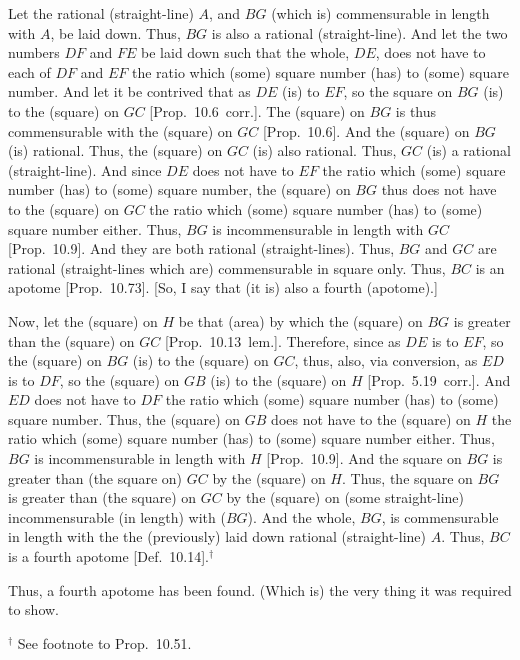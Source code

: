 \begin{Parallel}{}{}
{Let the rational (straight-line) $A$, and $BG$ (which is)
commensurable in length with $A$, be laid down.
Thus, $BG$ is also a rational (straight-line). And let the two numbers $DF$
and $FE$ be laid down such that the whole, $DE$, does not have to
each of $DF$ and $EF$ the ratio which (some) square number (has)
to (some) square number. And let it be contrived that as $DE$
(is) to $EF$, so the square on $BG$ (is) to the (square) on $GC$
[Prop.~10.6~corr.]. The (square) on $BG$ is
thus commensurable with the (square) on $GC$ [Prop.~10.6]. And the (square) on $BG$ (is)
rational. Thus, the (square) on $GC$ (is) also rational. Thus, $GC$
(is) a rational (straight-line). And since $DE$ does not have to $EF$
the ratio which (some) square number (has) to (some) square number,
the (square) on $BG$ thus does not have to the (square) on $GC$ the
ratio which (some) square number (has) to (some) square number either.
Thus, $BG$ is incommensurable in length with $GC$ [Prop.~10.9]. And they are both rational (straight-lines). Thus, $BG$ and $GC$ are rational (straight-lines which are)
commensurable in square only. Thus, $BC$ is an apotome [Prop.~10.73]. [So, I say that
(it is) also a fourth (apotome).]

Now, let the (square) on $H$ be that (area) by which the (square)
on $BG$ is greater than the (square) on $GC$ [Prop.~10.13~lem.]. Therefore, since as
$DE$ is to $EF$, so the (square) on $BG$ (is) to the (square)
on $GC$, thus, also, via conversion, as $ED$ is to $DF$, so the
(square) on $GB$ (is) to the (square) on $H$ [Prop.~5.19~corr.]. And $ED$ does not have to
$DF$ the ratio which (some) square number (has) to (some) square number.
Thus, the (square) on $GB$ does not have to the (square) on $H$
the ratio which (some) square number (has) to (some) square number either.
Thus, $BG$ is incommensurable in length with $H$ [Prop.~10.9]. And the square on $BG$ is greater
than (the square on) $GC$ by the (square) on $H$. Thus, the
square on $BG$ is greater than (the square) on $GC$ by the (square)
on (some straight-line) incommensurable (in length) with ($BG$). And the whole,
$BG$, is commensurable in length with the the (previously) laid
down rational (straight-line) $A$. Thus, $BC$ is a fourth apotome
[Def.~10.14].$^\dag$

Thus, a fourth apotome has been found. (Which is) the very thing it was required to show.}
\end{Parallel}
{\footnotesize\noindent$^\dag$ See footnote to Prop.~10.51.}

